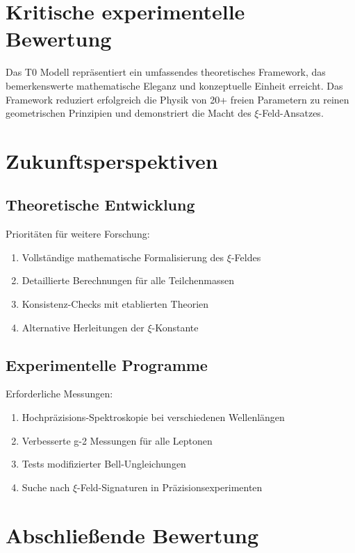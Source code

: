 \documentclass[12pt,a4paper]{report}
\begin{document}
	\section{Kritische experimentelle Bewertung}
	
	Das T0 Modell repräsentiert ein umfassendes theoretisches Framework, das bemerkenswerte mathematische Eleganz und konzeptuelle Einheit erreicht. Das Framework reduziert erfolgreich die Physik von 20+ freien Parametern zu reinen geometrischen Prinzipien und demonstriert die Macht des $\xi$-Feld-Ansatzes.
	
	\section{Zukunftsperspektiven}
	
	\subsection{Theoretische Entwicklung}
	
	Prioritäten für weitere Forschung:
	
	\begin{enumerate}
		\item Vollständige mathematische Formalisierung des $\xi$-Feldes
		\item Detaillierte Berechnungen für alle Teilchenmassen
		\item Konsistenz-Checks mit etablierten Theorien
		\item Alternative Herleitungen der $\xi$-Konstante
	\end{enumerate}
	
	\subsection{Experimentelle Programme}
	
	Erforderliche Messungen:
	
	\begin{enumerate}
		\item Hochpräzisions-Spektroskopie bei verschiedenen Wellenlängen
		\item Verbesserte g-2 Messungen für alle Leptonen
		\item Tests modifizierter Bell-Ungleichungen
		\item Suche nach $\xi$-Feld-Signaturen in Präzisionsexperimenten
	\end{enumerate}
	
	\section{Abschließende Bewertung}
	
\end{document}

